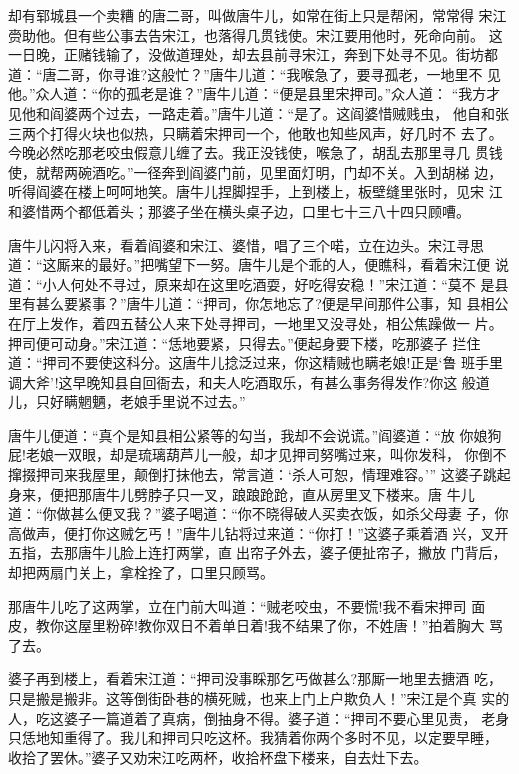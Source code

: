却有郓城县一个卖糟的唐二哥，叫做唐牛儿，如常在街上只是帮闲，常常得
宋江赍助他。但有些公事去告宋江，也落得几贯钱使。宋江要用他时，死命向前。
这一日晚，正赌钱输了，没做道理处，却去县前寻宋江，奔到下处寻不见。街坊都
道：“唐二哥，你寻谁?这般忙？”唐牛儿道：“我喉急了，要寻孤老，一地里不
见他。”众人道：“你的孤老是谁？”唐牛儿道：“便是县里宋押司。”众人道：
“我方才见他和阎婆两个过去，一路走着。”唐牛儿道：“是了。这阎婆惜贼贱虫，
他自和张三两个打得火块也似热，只瞒着宋押司一个，他敢也知些风声，好几时不
去了。今晚必然吃那老咬虫假意儿缠了去。我正没钱使，喉急了，胡乱去那里寻几
贯钱使，就帮两碗酒吃。”一径奔到阎婆门前，见里面灯明，门却不关。入到胡梯
边，听得阎婆在楼上呵呵地笑。唐牛儿捏脚捏手，上到楼上，板壁缝里张时，见宋
江和婆惜两个都低着头；那婆子坐在横头桌子边，口里七十三八十四只顾嘈。

唐牛儿闪将入来，看着阎婆和宋江、婆惜，唱了三个喏，立在边头。宋江寻思
道：“这厮来的最好。”把嘴望下一努。唐牛儿是个乖的人，便瞧科，看着宋江便
说道：“小人何处不寻过，原来却在这里吃酒耍，好吃得安稳！”宋江道：“莫不
是县里有甚么要紧事？”唐牛儿道：“押司，你怎地忘了?便是早间那件公事，知
县相公在厅上发作，着四五替公人来下处寻押司，一地里又没寻处，相公焦躁做一
片。押司便可动身。”宋江道：“恁地要紧，只得去。”便起身要下楼，吃那婆子
拦住道：“押司不要使这科分。这唐牛儿捻泛过来，你这精贼也瞒老娘!正是‘鲁
班手里调大斧’!这早晚知县自回衙去，和夫人吃酒取乐，有甚么事务得发作?你这
般道儿，只好瞒魍魉，老娘手里说不过去。”

唐牛儿便道：“真个是知县相公紧等的勾当，我却不会说谎。”阎婆道：“放
你娘狗屁!老娘一双眼，却是琉璃葫芦儿一般，却才见押司努嘴过来，叫你发科，
你倒不撺掇押司来我屋里，颠倒打抹他去，常言道：‘杀人可恕，情理难容。’”
这婆子跳起身来，便把那唐牛儿劈脖子只一叉，踉踉跄跄，直从房里叉下楼来。唐
牛儿道：“你做甚么便叉我？”婆子喝道：“你不晓得破人买卖衣饭，如杀父母妻
子，你高做声，便打你这贼乞丐！”唐牛儿钻将过来道：“你打！”这婆子乘着酒
兴，叉开五指，去那唐牛儿脸上连打两掌，直出帘子外去，婆子便扯帘子，撇放
门背后，却把两扇门关上，拿栓拴了，口里只顾骂。

那唐牛儿吃了这两掌，立在门前大叫道：“贼老咬虫，不要慌!我不看宋押司
面皮，教你这屋里粉碎!教你双日不着单日着!我不结果了你，不姓唐！”拍着胸大
骂了去。

婆子再到楼上，看着宋江道：“押司没事睬那乞丐做甚么?那厮一地里去搪酒
吃，只是搬是搬非。这等倒街卧巷的横死贼，也来上门上户欺负人！”宋江是个真
实的人，吃这婆子一篇道着了真病，倒抽身不得。婆子道：“押司不要心里见责，
老身只恁地知重得了。我儿和押司只吃这杯。我猜着你两个多时不见，以定要早睡，
收拾了罢休。”婆子又劝宋江吃两杯，收拾杯盘下楼来，自去灶下去。

